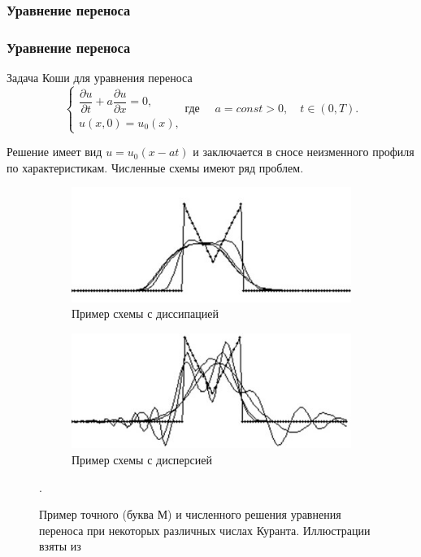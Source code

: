 \documentclass{beamer}
\begin{document}
\frametitle{Уравнение переноса}
\begin{frame}
\frametitle{Уравнение переноса}
	\begin{block}{Задача Коши для уравнения переноса}
		\begin{equation}
			\begin{cases}
				\dfrac{\partial u}{\partial t} + a\dfrac{\partial u}{\partial x} = 0, \\
				u(x, 0) = u_0(x),
			\end{cases} 
			\text{где } \quad a = const > 0, \quad t \in (0, T) .
		\end{equation}
		
		Решение имеет вид $u = u_0(x-at)$ и заключается в сносе неизменного профиля по характеристикам. Численные схемы имеют ряд проблем.
	\end{block}
	
	\vspace{-0.5em}
	\begin{figure}[!h]
		\centering
		\begin{subfigure}[t]{0.44\textwidth}
			\centering
			\includegraphics[width=\textwidth]{prim1}
			\caption{Пример схемы с диссипацией}
		\end{subfigure}
		\quad\quad\quad
		\begin{subfigure}[t]{0.44\textwidth}
			\centering
			\includegraphics[width=\textwidth]{prim2}
			\caption{Пример схемы с дисперсией}
		\end{subfigure}
		\vspace{-1em}
		\caption{Пример точного (буква М) и численного решения уравнения переноса при некоторых различных числах Куранта. Иллюстрации взяты из \cite[c.416]{1}} .
	\end{figure}
\end{frame}
	
\end{document}

